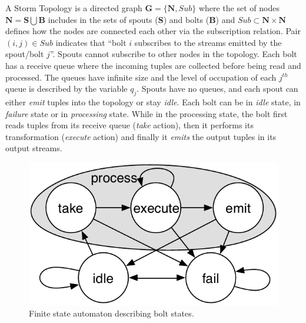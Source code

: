 A Storm Topology is a directed graph $\mathbf{G} = \{ \mathbf{N}, Sub\}$ where the set of nodes $\mathbf{N} = \mathbf{S}\bigcup \mathbf{B}$ includes in the sets of spouts (\textbf{S}) and bolts (\textbf{B}) and %
$Sub\subset\mathbf{N}\times\mathbf{N}$ defines how the nodes are connected each other via the subscription relation. Pair $(i,j)\in Sub$ indicates that ``bolt $i$ subscribes to the streams emitted by the spout/bolt $j$''. 
Spouts cannot subscribe to other nodes in the topology.
Each bolt has a receive queue where the incoming tuples are collected before being read and processed. %
The queues have infinite size and the level of occupation of each $j^{th}$ queue is described by the variable $q_j$. %
Spouts have no queues, and 
each spout can either \textit{emit} tuples into the topology or stay \emph{idle}.
Each bolt can be in \emph{idle} state, in \emph{failure} state or in  \emph{processing} state.  While in the processing state, the bolt first reads tuples from its receive queue (\textit{take} action), then it performs its transformation (\textit{execute} action) and finally it \textit{emits} the output tuples in its output streams. \\
\begin{figure}[tb]
\centering
\includegraphics[width=0.7\linewidth]{images/bolt-fsm}
\caption{Finite state automaton describing bolt states.}
\label{figure-fsa}
\end{figure}

